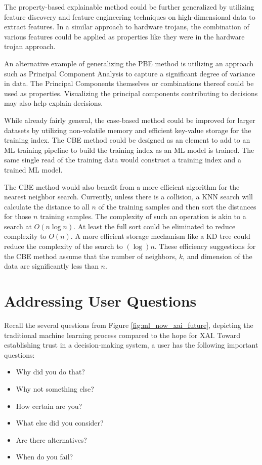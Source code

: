 The property-based explainable method could be further generalized by utilizing
feature discovery and feature engineering techniques on high-dimensional data to
extract features. In a similar approach to hardware trojans, the combination of
various features could be applied as properties like they were in the hardware
trojan approach.

An alternative example of generalizing the PBE method is utilizing an approach
such as Principal Component Analysis to capture a significant degree of variance
in data. The Principal Components themselves or combinations thereof could be
used as properties. Visualizing the principal components contributing to
decisions may also help explain decisions.

While already fairly general, the case-based method could be improved for larger
datasets by utilizing non-volatile memory and efficient key-value storage for
the training index. The CBE method could be designed as an element to add to an
ML training pipeline to build the training index as an ML model is trained. The
same single read of the training data would construct a training index and a
trained ML model.

The CBE method would also benefit from a more efficient algorithm for the
nearest neighbor search. Currently, unless there is a collision, a KNN search
will calculate the distance to all $n$ of the training samples and then sort
the distances for those $n$ training samples. The complexity of such an
operation is akin to a search at $O(n\log{}n)$. At least the full sort could be
eliminated to reduce complexity to $O(n)$. A more efficient storage mechanism
like a KD tree could reduce the complexity of the search to $(\log{})n$. These
efficiency suggestions for the CBE method assume that the number of neighbors,
$k$, and dimension of the data are significantly less than $n$. 

\section{Addressing User Questions}

Recall the several questions from Figure \ref{fig:ml_now_xai_future}, depicting
the traditional machine learning process compared to the hope for XAI. Toward
establishing trust in a decision-making system, a user has the following
important questions:

\begin{itemize}
    \item Why did you do that?
    \item Why not something else?
    \item How certain are you?
    \item What else did you consider?
    \item Are there alternatives?
    \item When do you fail?
\end{itemize}

